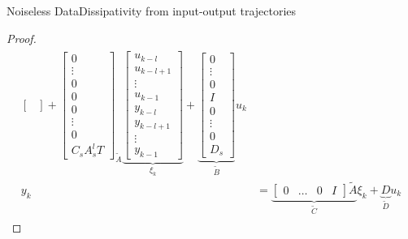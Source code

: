 \documentclass[aspectratio=169, handout, 10pt, hyperref=colorlinks]{beamer}
\begin{document}
\begin{frame}[allowframebreaks]{Noiseless Data}{Dissipativity from input-output trajectories}
\begin{proof}
\begin{align}
\begin{split}
{\begin{bmatrix}
    \end{bmatrix} + \begin{bmatrix} 0 \\ \vdots \\ 0\\ 0 \\ 0 \\ \vdots \\ 0 \\ C_s A_s^l T \end{bmatrix} }_{\widetilde{A}} \underbrace{\begin{bmatrix} u_{k-l} \\ u_{k-l+1} \\ \vdots \\ u_{k-1} \\ y_{k-l} \\ y_{k-l+1} \\ \vdots \\ y_{k-1} \end{bmatrix}}_{\xi_{k}} + \underbrace{\begin{bmatrix} 0 \\ \vdots \\ 0 \\ I \\ 0 \\ \vdots \\ 0 \\ D_s  \end{bmatrix}}_{\widetilde{B}} u_{k} \\
    y_k &= \underbrace{\begin{bmatrix} 0 & \dots & 0 & I \end{bmatrix} \tilde{A}}_{\tilde{C}} \xi_k + \underbrace{D}_{\tilde{D}} u_k
    \end{split} 
    \end{align}
    \end{proof} 
\end{frame}
\end{document}
